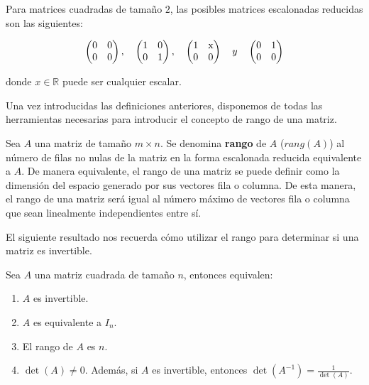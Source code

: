 \begin{ejemplo}
    Para matrices cuadradas de tamaño $2$, las posibles matrices escalonadas reducidas son las siguientes:

    \[
        \begin{pmatrix} 0 & 0 \\ 0 & 0 \end{pmatrix}, \quad
        \begin{pmatrix} 1 & 0 \\ 0 & 1 \end{pmatrix}, \quad
        \begin{pmatrix} 1 & $x$ \\ 0 & 0 \end{pmatrix} \quad y \quad
        \begin{pmatrix} 0 & 1 \\ 0 & 0
        \end{pmatrix}
    \]

    donde $x \in \mathbb{R}$ puede ser cualquier escalar.
\end{ejemplo}

Una vez introducidas las definiciones anteriores, disponemos de todas las herramientas necesarias para introducir el concepto de rango de una matriz.

\begin{definicion}
    Sea $A$ una matriz de tamaño $m \times n$. Se denomina \textbf{rango} de $A$ ($rang(A)$) al número de filas no nulas de la matriz en la forma escalonada reducida equivalente a $A$. De manera equivalente, el rango de una matriz se puede definir como la dimensión del espacio generado por sus vectores fila o columna. De esta manera, el rango de una matriz será igual al número máximo de vectores fila o columna que sean linealmente independientes entre sí.
\end{definicion}

El siguiente resultado nos recuerda cómo utilizar el rango para determinar si una matriz es invertible.

\begin{proposicion}
    Sea $A$ una matriz cuadrada de tamaño $n$, entonces equivalen:

    \begin{enumerate}
        \item $A$ es invertible.
        \item $A$ es equivalente a $I_n$.
        \item El rango de $A$ es $n$.
        \item $\det(A) \neq 0$. Además, si $A$ es invertible, entonces $\det(A^{-1})=\frac{1}{\det(A)}$.
    \end{enumerate}
\end{proposicion}


